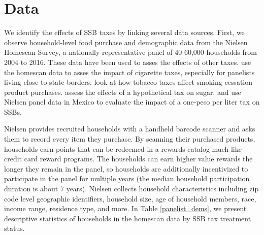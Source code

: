 \documentclass[12pt]{article}
\begin{document}
\section{Data} \label{data}

We identify the effects of SSB taxes by linking several data sources. First, we observe household-level food purchase and demographic data from the Nielsen Homescan Survey, a nationally representative panel of 40-60,000 households from 2004 to 2016. These data have been used to asses the effects of other taxes. \textcite{harding2012heterogeneous} use the homescan data to asses the impact of cigarette taxes, especially for panelists living close to state borders. \textcite{cotti2016effects} look at how tobacco taxes affect smoking cessation product purchases. \textcite{dharmasena2012intended} assess the effects of a hypothetical tax on sugar. \textcite{colchero2016beverage} and \textcite{colchero2017mexico} use Nielsen panel data in Mexico to evaluate the impact of a one-peso per liter tax on SSBs.

Nielsen provides recruited households with a handheld barcode scanner and asks them to record every item they purchase. By scanning their purchased products, households earn points that can be redeemed in a rewards catalog much like credit card reward programs. The households can earn higher value rewards the longer they remain in the panel, so households are additionally incentivized to participate in the panel for multiple years (the median household participation duration is about 7 years). Nielsen collects household characteristics including zip code level geographic identifiers, household size, age of household members, race, income range, residence type, and more. In Table \ref{panelist_dems}, we present descriptive statistics of households in the homescan data by SSB tax treatment status.
\end{document}
